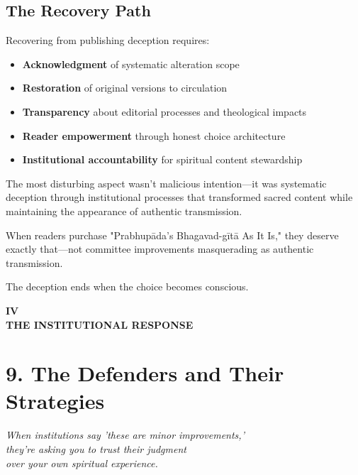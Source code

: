 \documentclass[11pt,twoside]{book}
\makeatletter
\def\cleardoublepage{\clearpage\if@twoside \ifodd\c@page\else\hbox{}\thispagestyle{empty}\newpage\if@twocolumn\hbox{}\newpage\fi\fi\fi}
\makeatother
\begin{document}
\section*{The Recovery Path}
\label{sec:org5f9541d}

Recovering from publishing deception requires:
\begin{itemize}
\item \textbf{\textbf{Acknowledgment}} of systematic alteration scope
\item \textbf{\textbf{Restoration}} of original versions to circulation
\item \textbf{\textbf{Transparency}} about editorial processes and theological impacts
\item \textbf{\textbf{Reader empowerment}} through honest choice architecture
\item \textbf{\textbf{Institutional accountability}} for spiritual content stewardship
\end{itemize}

The most disturbing aspect wasn't malicious intention—it was systematic deception through institutional processes that transformed sacred content while maintaining the appearance of authentic transmission.

When readers purchase "Prabhupāda's Bhagavad-gītā As It Is," they deserve exactly that—not committee improvements masquerading as authentic transmission.

The deception ends when the choice becomes conscious.

\cleardoublepage
\thispagestyle{empty}
\vspace*{0.25\textheight}
\begin{center}
{\Huge\bfseries\MakeUppercase{\textbf{IV}}}\\[0.5cm]
{\huge\bfseries THE INSTITUTIONAL RESPONSE}
\end{center}
\vspace*{\fill}
\clearpage
\thispagestyle{empty} %
\mbox{}
\newpage
\chapter*{9. The Defenders and Their Strategies}
\label{sec:org5cf3daa}

{\centering\itshape When institutions say 'these are minor improvements,'\\they're asking you to trust their judgment\\over your own spiritual experience.\par}
\vspace{0.3cm}
\end{document}
